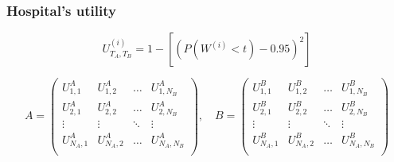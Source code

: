 

\begin{frame}
    \frametitle{Hospital's utility}

    \begin{equation*}
        U_{T_A,T_B}^{(i)} = 1 - \left[ (P(W^{(i)} < t) - 0.95)^2 \right]
    \end{equation*}

    \scriptsize
    \begin{equation*}
        A = 
        \begin{pmatrix}
            U_{1,1}^A & U_{1,2}^A & \dots & U_{1,N_B}^A \\ 
            U_{2,1}^A & U_{2,2}^A & \dots & U_{2,N_B}^A \\
            \vdots & \vdots & \ddots & \vdots \\
            U_{N_A,1}^A & U_{N_A,2}^A & \dots & U_{N_A,N_B}^A \\
        \end{pmatrix}, \quad
        B = 
        \begin{pmatrix}
            U_{1,1}^B & U_{1,2}^B & \dots & U_{1,N_B}^B \\ 
            U_{2,1}^B & U_{2,2}^B & \dots & U_{2,N_B}^B \\
            \vdots & \vdots & \ddots & \vdots \\
            U_{N_A,1}^B & U_{N_A,2}^B & \dots & U_{N_A,N_B}^B \\
        \end{pmatrix}
    \end{equation*}

\end{frame}


